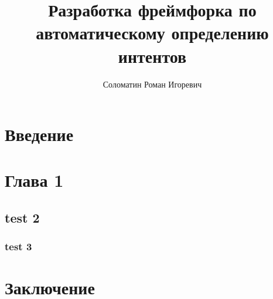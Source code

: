 \documentclass[14pt,a4paper,oneside,openany]{book}
\author{Соломатин Роман Игоревич}
\date{}
\title{Разработка фреймфорка по автоматическому определению интентов}
\begin{document}
\MyTOC

\chapter*{Введение}
\label{sec:orgb19e4e3}
\chapter{Глава 1}
\label{sec:org51fa31c}
\autocite{vaswani_attention_2017}
\section{test 2}
\label{sec:orgab3f6ea}
\subsection{test 3}
\label{sec:org9c66282}
\chapter*{Заключение}
\label{sec:org4afd8a4}
\printbibliography[title=СПИСОК\spaceИСПОЛЬЗОВАНЫХ\spaceИСТОЧНИКОВ]
\end{document}

